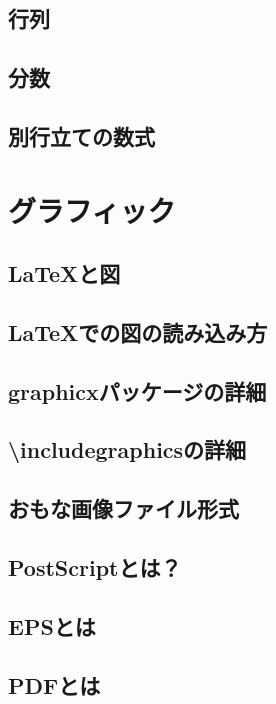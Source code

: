 \documentclass{jsbook}
\begin{document}
\section{行列}

\section{分数}

\section{別行立ての数式}

\chapter{グラフィック}

\section{LaTeXと図}

\section{LaTeXでの図の読み込み方}

\section{graphicxパッケージの詳細}

\section{\textbackslash includegraphicsの詳細}

\section{おもな画像ファイル形式}

\section{PostScriptとは？}

\section{EPSとは}

\section{PDFとは}
\end{document}
